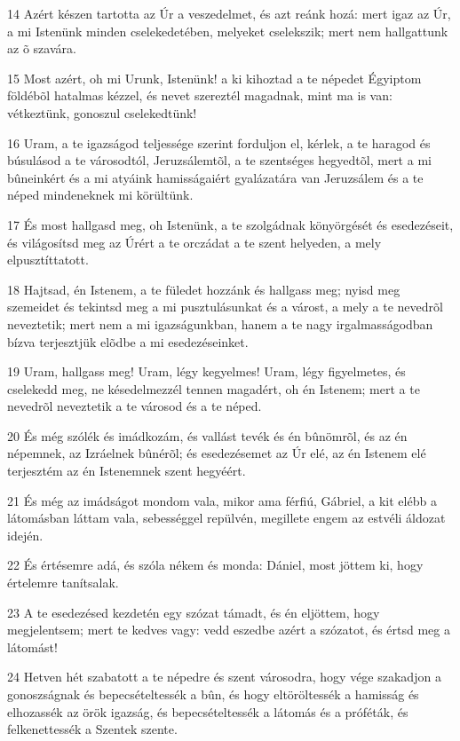 \par 14 Azért készen tartotta az Úr a veszedelmet, és azt reánk hozá: mert igaz az Úr, a mi Istenünk minden cselekedetében, melyeket cselekszik; mert nem hallgattunk az õ szavára.
\par 15 Most azért, oh mi Urunk, Istenünk! a ki kihoztad a te népedet Égyiptom földébõl hatalmas kézzel, és nevet szereztél magadnak, mint ma is van: vétkeztünk, gonoszul cselekedtünk!
\par 16 Uram, a te igazságod teljessége szerint forduljon el, kérlek, a te haragod és búsulásod a te városodtól, Jeruzsálemtõl, a te szentséges hegyedtõl, mert a mi bûneinkért és a mi atyáink hamisságaiért  gyalázatára van Jeruzsálem és a te néped mindeneknek mi körültünk.
\par 17 És most hallgasd meg, oh Istenünk, a te szolgádnak könyörgését és esedezéseit, és világosítsd meg az Úrért a te orczádat a te szent helyeden, a mely elpusztíttatott.
\par 18 Hajtsad, én Istenem, a te füledet hozzánk és hallgass meg; nyisd meg szemeidet és tekintsd meg a mi pusztulásunkat és a várost, a mely a te nevedrõl neveztetik; mert nem a mi igazságunkban, hanem a te nagy irgalmasságodban bízva terjesztjük elõdbe a mi esedezéseinket.
\par 19 Uram, hallgass meg! Uram, légy kegyelmes! Uram, légy figyelmetes, és cselekedd meg, ne késedelmezzél tennen magadért, oh én Istenem; mert a te nevedrõl neveztetik a te városod és a te néped.
\par 20 És még szólék és imádkozám, és vallást tevék és én bûnömrõl, és az én népemnek, az Izráelnek bûnérõl; és esedezésemet az Úr elé, az én Istenem elé terjesztém az én Istenemnek szent hegyéért.
\par 21 És még az imádságot mondom vala, mikor ama férfiú, Gábriel, a kit elébb a látomásban láttam vala, sebességgel repülvén, megillete engem az estvéli áldozat idején.
\par 22 És értésemre adá, és szóla nékem és monda: Dániel, most jöttem ki, hogy értelemre tanítsalak.
\par 23 A te esedezésed kezdetén egy szózat támadt, és én eljöttem, hogy megjelentsem; mert te kedves vagy: vedd eszedbe azért a szózatot, és értsd meg a látomást!
\par 24 Hetven hét szabatott a te népedre és szent városodra, hogy vége szakadjon a gonoszságnak és bepecsételtessék a bûn, és hogy eltöröltessék a hamisság és elhozassék az örök igazság, és bepecsételtessék a látomás és a próféták, és felkenettessék a Szentek szente.
